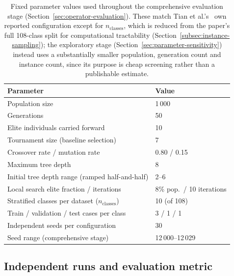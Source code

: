 
\begin{table}[htbp]
  \centering
  \small
  \caption[Experimental parameters]{Fixed parameter values used throughout
  the comprehensive evaluation stage (Section~\ref{sec:operator-evaluation}).
  These match Tian et al.'s~\cite{Tian2024GPHH} own reported configuration
  except for $n_{\text{classes}}$, which is reduced from the paper's full
  108-class split for computational tractability
  (Section~\ref{subsec:instance-sampling}); the exploratory stage
  (Section~\ref{sec:parameter-sensitivity}) instead uses a substantially
  smaller population, generation count and instance count, since its purpose
  is cheap screening rather than a publishable estimate.}
  \label{tab:experimental-parameters}
  \begin{tabular}{@{}p{}p{}@{}}
    \toprule
    \textbf{Parameter} & \textbf{Value} \\
    \midrule
    Population size & 1\,000 \\
    Generations & 50 \\
    Elite individuals carried forward & 10 \\
    Tournament size (baseline selection) & 7 \\
    Crossover rate / mutation rate & 0.80 / 0.15 \\
    Maximum tree depth & 8 \\
    Initial tree depth range (ramped half-and-half) & 2--6 \\
    Local search elite fraction / iterations & 8\% pop.\ / 10 iterations \\
    Stratified classes per dataset ($n_{\text{classes}}$) & 10 (of 108) \\
    Train / validation / test cases per class & 3 / 1 / 1 \\
    Independent seeds per configuration & 30 \\
    Seed range (comprehensive stage) & 12\,000--12\,029 \\
    \bottomrule
  \end{tabular}
\end{table}

\subsection{Independent runs and evaluation metric}
\label{subsec:runs-and-metric}

